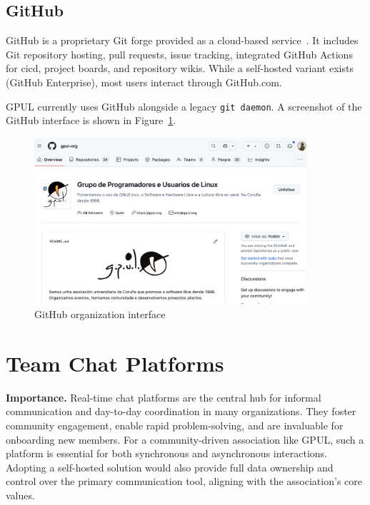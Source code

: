 \subsection*{GitHub}

GitHub is a proprietary Git forge provided as a cloud-based service~\cite{github-docs}. It includes Git repository hosting, pull requests, issue tracking, integrated GitHub Actions for \gls{cicd}, project boards, and repository wikis. While a self-hosted variant exists (GitHub Enterprise), most users interact through GitHub.com.

GPUL currently uses GitHub alongside a legacy \texttt{git daemon}. A screenshot of the GitHub interface is shown in Figure~\ref{fig:github-ui}.

\begin{figure}[H]
  \centering
  \includegraphics[width=0.9\textwidth]{imaxes/github-ui.png}
  \caption{GitHub organization interface}
  \label{fig:github-ui}
\end{figure}

\section{Team Chat Platforms}

\textbf{Importance.} Real-time chat platforms are the central hub for informal communication and day-to-day coordination in many organizations. They foster community engagement, enable rapid problem-solving, and are invaluable for onboarding new members. For a community-driven association like GPUL, such a platform is essential for both synchronous and asynchronous interactions. Adopting a self-hosted solution would also provide full data ownership and control over the primary communication tool, aligning with the association's core values.

